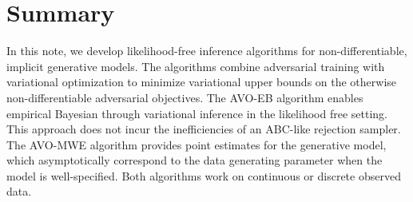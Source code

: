 \documentclass[twocolumn,superscriptaddress,aps]{revtex4-1}
\newcommand{\bftheta}{{\bm \theta}}
\newcommand{\bfpsi}{{\bm \psi}}
\newcommand{\bfphi}{{\bm \phi}}
\newcommand{\bfx}{\mathbf{x}}
\theoremstyle{plain}
\begin{document}
%
%
%
%
%





\section{Summary}

In this note, we develop likelihood-free inference algorithms for non-differentiable, implicit generative models.
The algorithms combine adversarial training  with variational optimization to
minimize variational upper bounds  on the otherwise non-differentiable
adversarial objectives.
The AVO-EB algorithm enables empirical Bayesian through variational inference in the likelihood free setting.
This approach does not incur the inefficiencies of an ABC-like rejection sampler. The AVO-MWE algorithm
provides point estimates for the generative model, which asymptotically correspond to the data generating parameter when the model is well-specified. Both algorithms work on continuous or discrete observed data.
\end{document}
